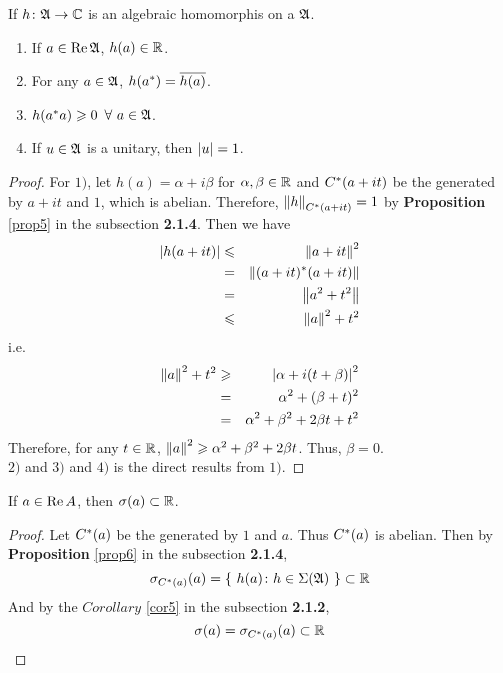 \documentclass[a4paper,11pt]{report}
\begin{document}
\begin{prop}
	If $h \colon \mathfrak{A} \rightarrow \mathbb{C}$ is an algebraic homomorphis on a \Cs $\mathfrak{A}$. 
	\begin{enumerate}[label=\arabic*)]
		\item If $a \in \operatorname{Re}{\mathfrak{A}}$, $h(a) \in \mathbb{R}$.
		\item For any $a \in \mathfrak{A}$, $h(a^{*})=\overline{h(a)}$.
		\item $h(a^{*}a) \geqslant 0$ $\forall~ a \in \mathfrak{A}$.
		\item If $u \in \mathfrak{A}$ is a unitary, then $\left\lvert u\right\lvert = 1$.
	\end{enumerate}
\end{prop}
\begin{proof}
	For $1)$, let $h(a) = \alpha +i \beta$ for $\alpha,\beta \in \mathbb{R}$ and $C^{*}(a+it)$ be the \Cs generated by $a+it$ and $1$, which is abelian. Therefore, $\left\lVert h\right\lVert_{C^{*}(a+it)} = 1$ by \textbf{Proposition} \ref{prop5} in the subsection \textbf{2.1.4}. Then we have
	\begin{eqnarray*}
		\left\lvert h(a+it)\right\lvert &\leqslant& \left\lVert a+it\right\lVert^{2} \\
		&=& \left\lVert(a+it)^{*}(a+it)\right\lVert \\
		&=& \left\lVert a^{2}+t^{2}\right\lVert \\
		&\leqslant& \left\lVert a\right\lVert^{2}+t^2
	\end{eqnarray*}
	i.e.
	\begin{eqnarray*}
		\left\lVert a\right\lVert^{2}+t^2 &\geqslant& \left\lvert\alpha +i(t+\beta)\right\lvert^2 \\
		&=& \alpha^2 + (\beta+t)^2 \\
		&=& \alpha^2 + \beta^2 +2 \beta t + t^2
	\end{eqnarray*}
	Therefore, for any $t \in \mathbb{R}$, $\left\lVert a\right\lVert^2 \geqslant \alpha^2 + \beta^2 +2 \beta t$. Thus, $\beta = 0$. \\
	$2)$ and $3)$ and $4)$ is the direct results from $1)$.
\end{proof}

\begin{cor}
	If $a \in \operatorname{Re}{A}$, then $\sigma(a) \subset \mathbb{R}$.
\end{cor}
\begin{proof}
	Let $C^{*}(a)$ be the \Cs generated by $1$ and $a$. Thus $C^{*}(a)$ is abelian. Then by \textbf{Proposition} \ref{prop6} in the subsection \textbf{2.1.4}, 
	\begin{equation*}
		\sigma_{C^{*}(a)}(a) = \{~ h(a) \colon h \in \Sigma(\mathfrak{A}) ~\} \subset \mathbb{R}
	\end{equation*} 
	And by the $Corollary$ \ref{cor5} in the subsection \textbf{2.1.2},
	\begin{equation*}
		\sigma(a) = \sigma_{C^{*}(a)}(a) \subset \mathbb{R}
	\end{equation*}
\end{proof}
\end{document}

